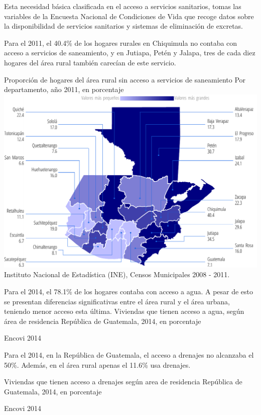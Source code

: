 %
{%
	Esta necesidad básica clasificada en el acceso a servicios sanitarios, tomas las variables de la Encuesta Nacional de Condiciones de Vida que recoge datos sobre la disponibilidad de servicios sanitarios y sistemas de eliminación de excretas.
	
	Para el 2011, el 40.4\% de los hogares rurales en Chiquimula no contaba con acceso a servicios de saneamiento, y en Jutiapa, Petén y Jalapa, tres de cada diez hogares del área rural también carecían de este servicio.   }%
{%
	Proporción de hogares del área rural sin acceso a servicios de saneamiento }
{%
	Por departamento, año 2011, en porcentaje} %
{%
	\includegraphics[width=52\cuadri]{graficas/1_15.pdf}}%
{%
	Instituto Nacional de Estadística (INE), Censos Municipales 2008 - 2011. } %



%
{%
	Para el 2014, el 78.1\% de los hogares contaba con acceso a agua. A pesar de esto se presentan diferencias significativas entre el área rural y el área urbana, teniendo menor acceso esta última.
}%
{%
	Viviendas que tienen acceso a agua, según área de residencia} %
{%
	República de Guatemala, 2014, en porcentaje} %
{%
	\begin{tikzpicture}[x=1pt,y=1pt]    \end{tikzpicture}}%
{%
	Encovi 2014} %



%
{%
	
	Para el 2014, en la República de Guatemala, el acceso a drenajes no alcanzaba el 50\%. Además, en el área rural apenas el 11.6\% usa drenajes. 
	
}%
{%
	Viviendas que tienen acceso a drenajes según area de residencia} %
{%
	República de Guatemala, 2014, en porcentaje} %
{%
	\begin{tikzpicture}[x=1pt,y=1pt]    \end{tikzpicture}}%
{%
	Encovi 2014} %



